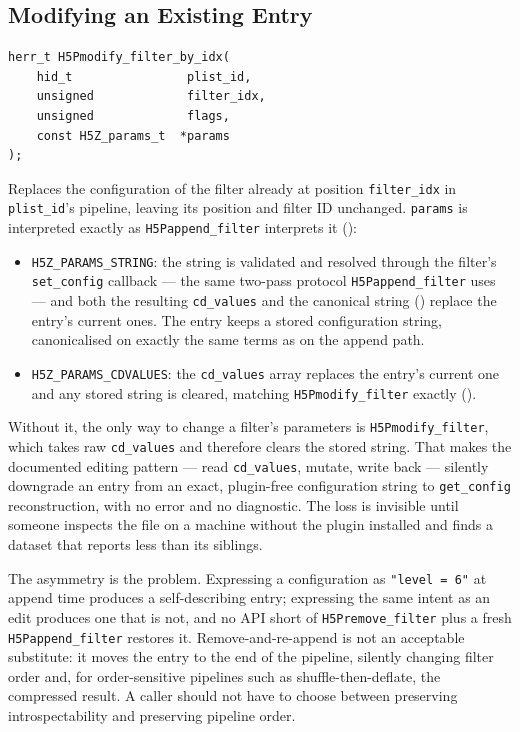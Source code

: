 \documentclass[../RFC-HDFG-2026-001.tex]{subfiles}
\begin{document}
\subsection{Modifying an Existing Entry}
\label{sec:modify-filter}

\begin{verbatim}
herr_t H5Pmodify_filter_by_idx(
    hid_t                plist_id,
    unsigned             filter_idx,
    unsigned             flags,
    const H5Z_params_t  *params
);
\end{verbatim}

Replaces the configuration of the filter already at position
\texttt{filter\_idx} in \texttt{plist\_id}'s pipeline, leaving its position
and filter ID unchanged.  \texttt{params} is interpreted exactly as
\texttt{H5Pappend\_filter} interprets it ():

\begin{itemize}
\item \texttt{H5Z\_PARAMS\_STRING}: the string is validated and resolved
  through the filter's \texttt{set\_config} callback --- the same two-pass
  protocol \texttt{H5Pappend\_filter} uses --- and both the resulting
  \texttt{cd\_values} and the canonical string
  () replace the entry's current
  ones.  The entry keeps a stored configuration string, canonicalised on
  exactly the same terms as on the append path.
\item \texttt{H5Z\_PARAMS\_CDVALUES}: the \texttt{cd\_values} array
  replaces the entry's current one and any stored string is cleared,
  matching \texttt{H5Pmodify\_filter} exactly
  ().
\end{itemize}


Without it, the only way to change a filter's parameters is
\texttt{H5Pmodify\_filter}, which takes raw \texttt{cd\_values} and
therefore clears the stored string.  That makes the documented editing
pattern --- read \texttt{cd\_values}, mutate, write back --- silently
downgrade an entry from an exact, plugin-free configuration string to
\texttt{get\_config} reconstruction, with no error and no diagnostic.  The
loss is invisible until someone inspects the file on a machine without the
plugin installed and finds a dataset that reports less than its siblings.

The asymmetry is the problem.  Expressing a configuration as
\texttt{"level = 6"} at append time produces a self-describing entry;
expressing the same intent as an edit produces one that is not, and no API
short of \texttt{H5Premove\_filter} plus a fresh \texttt{H5Pappend\_filter}
restores it.  Remove-and-re-append is not an acceptable substitute: it
moves the entry to the end of the pipeline, silently changing filter order
and, for order-sensitive pipelines such as shuffle-then-deflate, the
compressed result.  A caller should not have to choose between preserving
introspectability and preserving pipeline order.
\end{document}
